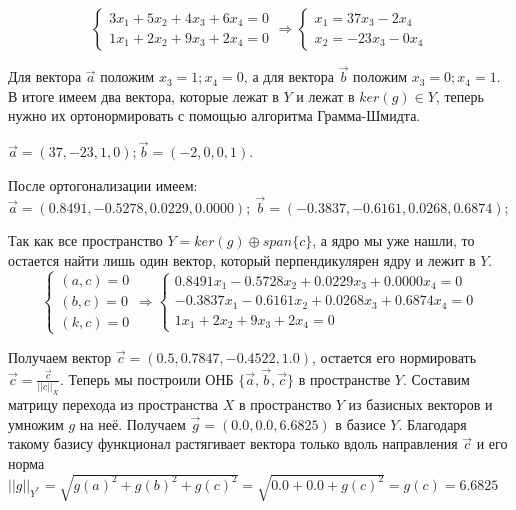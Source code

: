 \documentclass[a4paper, 12pt]{article}
\theoremstyle{plain}
\theoremstyle{definition}
\theoremstyle{remark}
\begin{document}
        \[
        \begin{cases}
            3x_1 + 5x_2 + 4x_3 + 6x_4 = 0 \\
            1x_1 + 2x_2 + 9x_3 + 2x_4 = 0
        \end{cases} \Rightarrow
        \begin{cases}
            x_1 =  37x_3 - 2x_4 \\
            x_2 = -23x_3 - 0x_4
        \end{cases}
        \]
        
        Для вектора $\overrightarrow{a}$ положим $x_3 = 1; x_4 = 0$, а для вектора $\overrightarrow{b}$ положим $x_3 = 0; x_4 = 1$.
        В итоге имеем два вектора, которые лежат в $Y$ и лежат в $ker(g) \in Y$, теперь нужно их ортонормировать с помощью алгоритма Грамма-Шмидта.
        
        $\overrightarrow{a} = (37, -23, 1, 0); \overrightarrow{b} = (-2, 0, 0, 1)$.

        После ортогонализации имеем: \\ 
        $\overrightarrow{a} = (0.8491, -0.5278, 0.0229, 0.0000); \ \overrightarrow{b} = (-0.3837, -0.6161, 0.0268, 0.6874);$
        
        Так как все пространство $Y = ker(g) \oplus span\{c\}$, а ядро мы уже нашли, то остается найти лишь один вектор, который перпендикулярен ядру и лежит в $Y$.
        \[
        \begin{cases}
            (a, c) = 0 \\
            (b, c) = 0 \\
            (k, c) = 0 
        \end{cases} \Rightarrow
        \begin{cases}
            0.8491x_1 - 0.5728x_2 + 0.0229x_3 + 0.0000x_4 = 0 \\
            -0.3837x_1 - 0.6161x_2 + 0.0268x_3 + 0.6874x_4 = 0 \\
            1x_1 + 2x_2 + 9x_3 + 2x_4 = 0 
        \end{cases}
        \]
        
        Получаем вектор $\overrightarrow{c} = (0.5, 0.7847, -0.4522, 1.0)$, остается его нормировать $\overrightarrow{c} = \frac{\overrightarrow{c}}{||c||_{X}}$. Теперь мы построили ОНБ $\{\overrightarrow{a}, \overrightarrow{b}, \overrightarrow{c}\}$ в пространстве $Y$.
        Составим матрицу перехода из пространства $X$ в пространство $Y$ из базисных векторов и умножим $g$ на неё. Получаем $\overrightarrow{g} = (0.0, 0.0, 6.6825)$ в базисе $Y$.
        Благодаря такому базису функционал растягивает вектора только вдоль направления $\overrightarrow{c}$ и его норма $||g||_{Y^*} = \sqrt{g(a)^2 + g(b)^ 2 + g(c)^2} = \sqrt{0.0 + 0.0 + g(c)^2} = g(c) = 6.6825$
        
\end{document}
